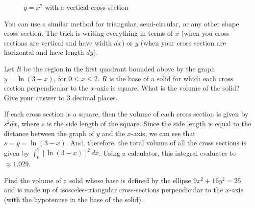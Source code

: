 \begin{figure}[htbp]
\centering
	\caption{$y = x^2$ with a vertical cross-section}
	\label{fig:parab} 
\end{figure}

You can use a similar method for triangular, semi-circular, or any other shape 
cross-section. The trick is writing everything in terms of $x$ (when you cross 
sections are vertical and have width $dx$) or $y$ (when your cross section are 
horizontal and have length $dy$). 

\begin{Exercise} Let $R$ be the region in the first 
quadrant bounded above by the graph $y = \ln{(3 - x)}$, for $0 \leq x \leq 2$. 
$R$ is the base of a solid for which each cross section perpendicular to the 
$x$-axis is square. What is the volume of the solid? Give your answer to 3 
decimal places. 
\vspace{50mm}
\end{Exercise}

\begin{Answer}[ref=AP_87]
If each cross section is a square, then the volume of each cross section is 
given by $s^2 dx$, where $s$ is the side length of the square. Since the side 
length is equal to the distance between the graph of $y$ and the $x$-axis, we 
can see that $s = y = \ln{(3 - x)}$. And, therefore, the total volume of all 
the cross sections is given by $\int_0^2 \left[\ln{(3 - x)} \right]^2\,dx$. 
Using a calculator, this integral evaluates to $\approx 1.029$. 
\end{Answer}

\begin{Exercise}[label = volume6]
Find the volume of a solid whose base is defined by the ellipse $9x^2 + 16y^2 =
25$ and is made up of isosceles-triangular cross-sections perpendicular to the 
$x$-axis (with the hypotenuse in the base of the solid). 
\vspace{40mm}
\end{Exercise}

